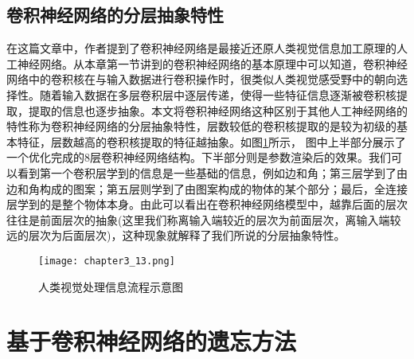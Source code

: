 \subsection{卷积神经网络的分层抽象特性}
在这篇文章\cite{2019arXiv190906161K}中，作者提到了卷积神经网络是最接近还原人类视觉信息加工原理的人工神经网络。从本章第一节讲到的卷积神经网络的基本原理中可以知道，卷积神经网络中的卷积核在与输入数据进行卷积操作时，很类似人类视觉感受野中的朝向选择性。随着输入数据在多层卷积层中逐层传递，使得一些特征信息逐渐被卷积核提取，提取的信息也逐步抽象。本文将卷积神经网络这种区别于其他人工神经网络的特性称为卷积神经网络的分层抽象特性，层数较低的卷积核提取的是较为初级的基本特征，层数越高的卷积核提取的特征越抽象。如图\ref{fig:chapter3_13}所示， 图中上半部分展示了一个优化完成的8层卷积神经网络结构。下半部分则是参数渲染后的效果。我们可以看到第一个卷积层学到的信息是一些基础的信息，例如边和角；第三层学到了由边和角构成的图案；第五层则学到了由图案构成的物体的某个部分；最后，全连接层学到的是整个物体本身。由此可以看出在卷积神经网络模型中，越靠后面的层次往往是前面层次的抽象(这里我们称离输入端较近的层次为前面层次，离输入端较远的层次为后面层次)，这种现象就解释了我们所说的分层抽象特性。
\begin{figure}
    \centering
    \texttt{[image: chapter3\_13.png]}
    \caption{人类视觉处理信息流程示意图}
    \label{fig:chapter3_13}
\end{figure}

\section{基于卷积神经网络的遗忘方法}
